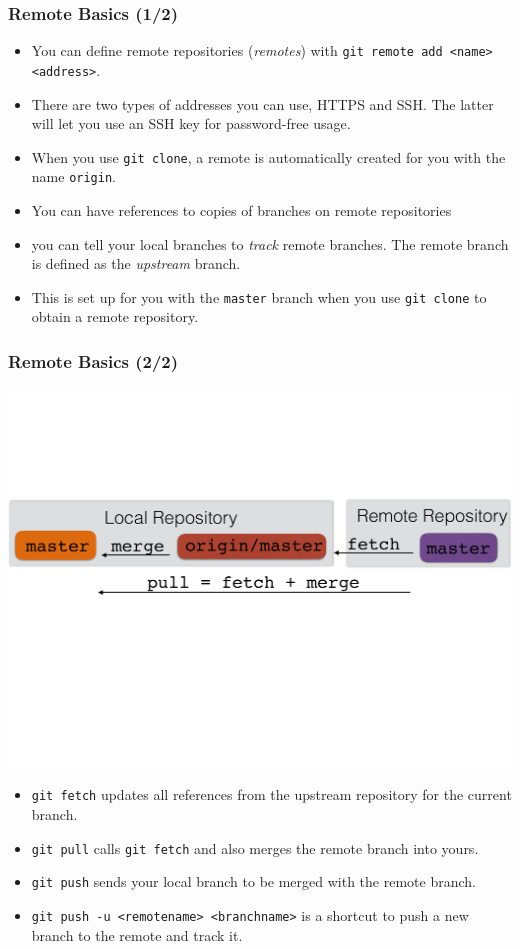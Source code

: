 \documentclass{beamer}
\begin{document}
\begin{frame}[fragile]
\frametitle{Remote Basics (1/2)}
\begin{itemize}
\item
You can define remote repositories (\emph{remotes}) with \lstinline{git remote add <name> <address>}.
\item There are two types of addresses you can use, HTTPS and SSH. The latter will let you use an SSH key for password-free usage.
\item When you use \lstinline{git clone}, a remote is automatically created for you with the name \texttt{origin}.
\item You can have references to copies of branches on remote repositories
\item you can tell your local branches to \emph{track} remote branches. The remote branch is defined as the \emph{upstream} branch.
\item This is set up for you with the \lstinline{master} branch when you use \lstinline{git clone} to obtain a remote repository.
\end{itemize}
\end{frame}

\begin{frame}[fragile]
\frametitle{Remote Basics (2/2)}
\includegraphics[width=\textwidth]{fetchcartoon}
\begin{itemize}
\item \lstinline{git fetch} updates all references from the upstream repository for the current branch.
\item \lstinline{git pull} calls \lstinline{git fetch} and also merges the remote branch into yours.
\item \lstinline{git push} sends your local branch to be merged with the remote branch.
\item \lstinline{git push -u <remotename> <branchname>} is a shortcut to push a new branch to the remote and track it.
\end{itemize}
\end{frame}
\end{document}
